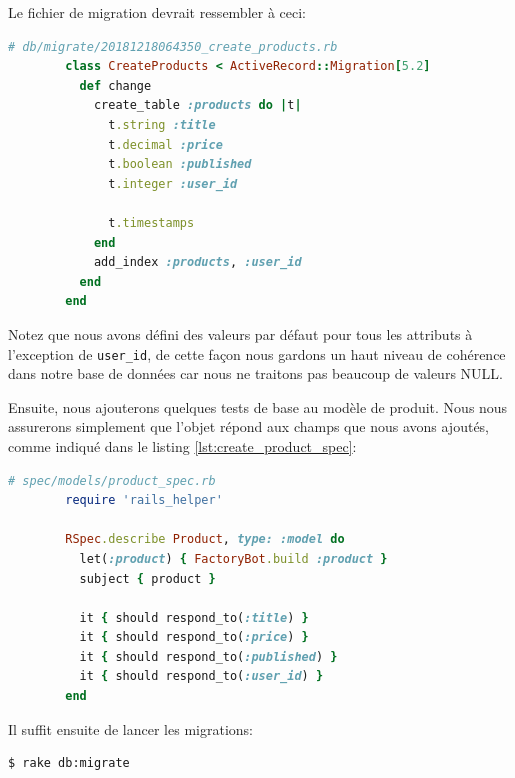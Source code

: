 \documentclass[]{report}
\begin{document}
      Le fichier de migration devrait ressembler à ceci:

      \begin{scriptsize}
        \begin{lstlisting}[language=ruby]
        # db/migrate/20181218064350_create_products.rb
        class CreateProducts < ActiveRecord::Migration[5.2]
          def change
            create_table :products do |t|
              t.string :title
              t.decimal :price
              t.boolean :published
              t.integer :user_id

              t.timestamps
            end
            add_index :products, :user_id
          end
        end
        \end{lstlisting}
      \end{scriptsize}

      Notez que nous avons défini des valeurs par défaut pour tous les attributs à l'exception de \verb|user_id|, de cette façon nous gardons un haut niveau de cohérence dans notre base de données car nous ne traitons pas beaucoup de valeurs NULL.

      Ensuite, nous ajouterons quelques tests de base au modèle de produit. Nous nous assurerons simplement que l'objet répond aux champs que nous avons ajoutés, comme indiqué dans le listing \ref{lst:create_product_spec}:

      \begin{scriptsize}
        \begin{lstlisting}[language=ruby, caption={Le premier test de notre modèle de produit}, label={lst:create_product_spec}]
        # spec/models/product_spec.rb
        require 'rails_helper'

        RSpec.describe Product, type: :model do
          let(:product) { FactoryBot.build :product }
          subject { product }

          it { should respond_to(:title) }
          it { should respond_to(:price) }
          it { should respond_to(:published) }
          it { should respond_to(:user_id) }
        end
        \end{lstlisting}
      \end{scriptsize}

      Il suffit ensuite de lancer les migrations:

      \begin{scriptsize}
        \begin{lstlisting}[language=bash]
        $ rake db:migrate
        \end{lstlisting}
      \end{scriptsize}
\end{document}
